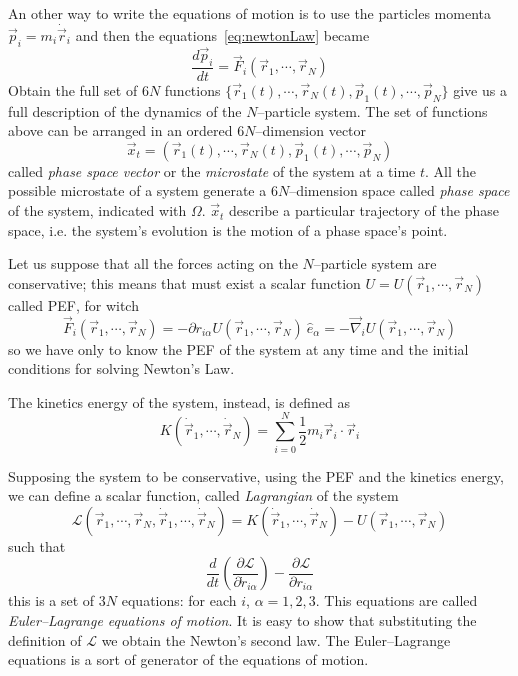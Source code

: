 An other way to write the equations of motion is to use the particles momenta $\vec p_i = m_i \dot{\vec{r}}_i$ and then the equations~\eqref{eq:newtonLaw} became
\begin{equation}
	\frac{d\vec p_i}{dt} = \vec F_i(\vec r_1,\cdots,\vec r_N)
	\label{eq:newtonLawMom}
\end{equation}
Obtain the full set of $6N$ functions $\{\vec r_1(t),\cdots,\vec r_N(t),\vec p_1(t),\cdots,\vec p_N\}$ give us a full description of the dynamics of the $N$--particle system. The set of functions above can be arranged in an ordered $6N$--dimension vector
\begin{equation}
	\vec x_t = (\vec r_1(t),\cdots,\vec r_N(t),\vec p_1(t),\cdots,\vec p_N)
	\label{eq:phSpaceVector}
\end{equation}
called \textit{phase space vector} or the \textit{microstate} of the system at a time $t$. All the possible microstate of a system generate a $6N$--dimension space called \textit{phase space} of the system, indicated with $\Omega$. $\vec x_t$ describe a particular trajectory of the phase space, i.e. the system's evolution is the motion of a phase space's point.

Let us suppose that all the forces acting on the $N$--particle system are conservative; this means that must exist a scalar function $U = U(\vec r_1, \cdots, \vec r_N)$ called \ac{PEF}, for witch
\begin{equation}
	\vec F_i(\vec r_1, \cdots, \vec r_N) = -\partial r_{i\alpha}U(\vec r_1, \cdots, \vec r_N)\ \hat e_\alpha = -\vec\nabla_i U(\vec r_1, \cdots, \vec r_N)
	\label{eq:pefForces}
\end{equation}
so we have only to know the \ac{PEF} of the system at any time and the initial conditions for solving Newton's Law.

The kinetics energy of the system, instead, is defined as
\begin{equation}
	K(\dot{\vec r}_1,\cdots,\dot{\vec r}_N) = \sum_{i=0}^N\frac{1}{2}m_i\vec r_i \cdot \vec r_i
	\label{eq:kinetics}
\end{equation}

Supposing the system to be conservative, using the \ac{PEF} and the kinetics energy, we can define a scalar function, called \textit{Lagrangian} of the system
\begin{equation}
	\mathcal{L}(\vec r_1, \cdots, \vec r_N, \dot{\vec r}_1,\cdots,\dot{\vec r}_N) = K(\dot{\vec r}_1,\cdots,\dot{\vec r}_N) - U(\vec r_1, \cdots, \vec r_N)
	\label{eq:lagrangian}
\end{equation}
such that
\begin{equation}
	\frac{d}{dt}\left ( \frac{\partial \mathcal{L}}{\partial \dot r_{i\alpha}}\right ) - \frac{\partial\mathcal{L}}{\partial r_{i\alpha}}
	\label{eq:EulerLagrange}
\end{equation}
this is a set of $3N$ equations: for each $i$, $\alpha=1,2,3$. This equations are called \textit{Euler--Lagrange equations of motion}. It is easy to show that substituting the definition of $\mathcal{L}$ we obtain the Newton's second law. The Euler--Lagrange equations is a sort of generator of the equations of motion.

